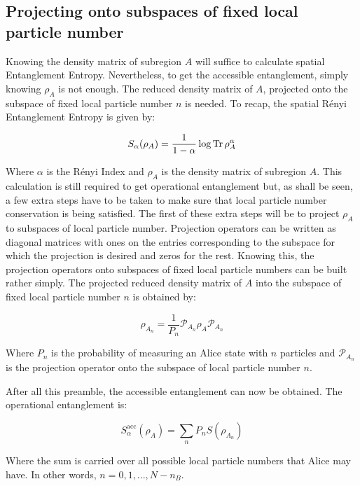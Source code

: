 	\subsection{Projecting onto subspaces of fixed local particle number}
	
	Knowing the density matrix of subregion $A$ will suffice to calculate spatial Entanglement Entropy. Nevertheless, to get the accessible entanglement, simply knowing $\rho_{A}$ is not enough. The reduced density matrix of $A$, projected onto the subspace of fixed local particle number $n$ is needed. To recap, the spatial R\'enyi Entanglement Entropy is given by:
	
	
\begin{equation}
 S_{\alpha}(\rho_{A}) = \frac{1}{1-\alpha} \log{\operatorname{Tr}{\rho_{A}^{\alpha}}} 
\end{equation}

Where $\alpha$ is the R\'enyi Index and $\rho_{A}$ is the density matrix of subregion $A$. This calculation is still required to get operational entanglement but, as shall be seen, a few extra steps have to be taken to make sure that local particle number conservation is being satisfied. The first of these extra steps will be to project $\rho_{A}$ to subspaces of local particle number. Projection operators can be written as diagonal matrices with ones on the entries corresponding to the subspace for which the projection is desired and zeros for the rest. Knowing this, the projection operators onto subspaces of fixed local particle numbers can be built rather simply. The projected reduced density matrix of  $A$ into the subspace of fixed local particle number $n$ is obtained by:

\begin{equation}
\rho_{A_n} = \frac{1}{P_n} \mathcal{P}_{A_n} \rho_A \mathcal{P}_{A_n}
\label{eq:accessibleEE}
\end{equation}

Where $P_n$ is the probability of measuring an Alice state with $n$ particles and $\mathcal{P}_{A_n}$ is the projection operator onto the subspace of local particle number $n$.

After all this preamble, the accessible entanglement can now be obtained. The operational entanglement is:

\begin{equation}
S_{\alpha}^{\mathrm{acc}}(\rho_A) = \sum_{n} P_n S(\rho_{A_n}) 
\label{eq:accessibleEE}
\end{equation}

Where the sum is carried over all possible local particle numbers that Alice may have. In other words, $n=0,1,...,N-n_{B}$.

